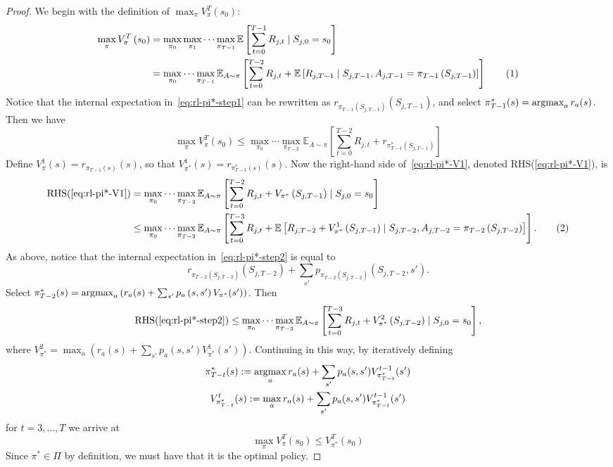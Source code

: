 \documentclass[11pt]{article}
\newcommand{\numbereqn}{\addtocounter{equation}{1}\tag{\theequation}}
\begin{document}
\begin{proof}
	We begin with the definition of $\max_{\pi}V_{\pi}^{T}(s_0)$:
	\begin{align*}
		\max_{\pi} V_{\pi}^{T}\left(s_{0}\right) &= \max_{\pi_{0}} \max_{\pi_{1}} \cdots \max_{\pi_{T-1}} \mathbb{E}\left[\sum_{t=0}^{T-1} R_{j, t} \mid S_{j,0} = s_{0}\right] \\
		&= \max_{\pi_{0}}\cdots \max_{\pi_{T-1}} \mathbb{E}_{A\sim\pi} \left[\sum_{t=0}^{T-2} R_{j,t} + \mathbb{E}\left[R_{j,T-1} \mid S_{j,T-1}, A_{j,T-1} = \pi_{T-1}\left(S_{j,T-1}\right)\right]\right] \numbereqn \label{eq:rl-pi*-step1}
	\end{align*}
	Notice that the internal expectation in~\cref{eq:rl-pi*-step1} can be rewritten as $r_{\pi_{T-1}(S_{j, T-1})}\left(S_{j,T-1}\right)$, and select $\pi_{T-1}^{*}(s) = \operatorname*{argmax}_{a} r_{a}(s)$. Then we have
	\begin{equation}
		\label{eq:rl-pi*-V1}
		\max_{\pi} V_{\pi}^{T}\left(s_{0}\right) \leq \max_{\pi_{0}}\cdots\max_{\pi_{T-2}} \mathbb{E}_{A\sim\pi} \left[\sum_{t=0}^{T-2} R_{j,t} + r_{\pi^{*}_{T-1}\left(S_{j,T-1}\right)}\right]
	\end{equation}
	Define $V_{\pi}^{1}(s) = r_{\pi_{T-1}(s)}(s)$, so that $V_{\pi^{*}}^{1}(s) = r_{\pi_{T-1}^{*}(s)}(s)$. Now the right-hand side of~\cref{eq:rl-pi*-V1}, denoted RHS(\ref{eq:rl-pi*-V1}), is
	\begin{align*}
		\text{RHS(\ref{eq:rl-pi*-V1})} &= \max_{\pi_{0}}\cdots\max_{\pi_{T-2}} \mathbb{E}_{A\sim \pi}\left[ \sum_{t=0}^{T-2} R_{j, t} + V_{\pi^{*}}\left(S_{j, T-1}\right) \mid S_{j, 0} = s_{0} \right] \\
		&\leq \max_{\pi_{0}} \cdots \max_{\pi_{T-2}} \mathbb{E}_{A\sim \pi} \left[\sum_{t=0}^{T-3} R_{j,t} + \mathbb{E}\left[ R_{j,T-2} + V_{\pi^{*}}^{1}\left(S_{j,T-1}\right) \mid S_{j,T-2}, A_{j,T-2} = \pi_{T-2}\left(S_{j,T-2}\right) \right]\right]. \numbereqn \label{eq:rl-pi*-step2}
	\end{align*}
	As above, notice that the internal expectation in~\cref{eq:rl-pi*-step2} is equal to 
	\[
		r_{\pi_{T-2}\left(S_{j,T-2}\right)}\left(S_{j,T-2}\right) + \sum_{s'} p_{\pi_{T-2}\left(S_{j,T-2}\right)}\left(S_{j,T-2}, s'\right).
	\]
	Select $\pi_{T-2}^{*}(s) = \operatorname*{argmax}_{a} \left(r_{a}(s) + \sum_{s'} p_{a}\left(s,s'\right) V_{\pi^*}(s')\right)$. Then
	\[
		\text{RHS(\ref{eq:rl-pi*-step2})} \leq \max_{\pi_{0}} \cdots \max_{\pi_{T-3}} \mathbb{E}_{A\sim\pi} \left[ \sum_{t=0}^{T-3} R_{j,t} + V_{\pi^*}^{2}\left(S_{j,T-2}\right) \mid S_{j,0} = s_{0} \right],
	\]
	where $V_{\pi^{*}}^{2} = \max_{a}\left(r_{a}(s) + \sum_{s'} p_{a}(s,s') V_{\pi^{*}}^{1}(s')\right)$. Continuing in this way, by iteratively defining
	\begin{gather*}
		\pi_{T-t}^{*}(s) := \operatorname*{argmax}_{a} r_{a}(s) + \sum_{s'} p_{a}(s,s') V_{\pi^{*}_{T-t}}^{t-1}(s') \\
		V_{\pi^*_{T-t}}^{t}(s) := \max_{a} r_{a}(s) + \sum_{s'} p_{a}(s,s') V_{\pi^{*}_{T-t}}^{t-1}(s')
	\end{gather*}
	for $t=3,\ldots,T$ we arrive at 
	\[
		\max_{\pi} V_{\pi}^{T}(s_{0}) \leq V_{\pi^*}^{T}(s_{0})
	\]
	Since $\pi^* \in \Pi$ by definition, we must have that it is the optimal policy.
\end{proof}

%
\end{document}
